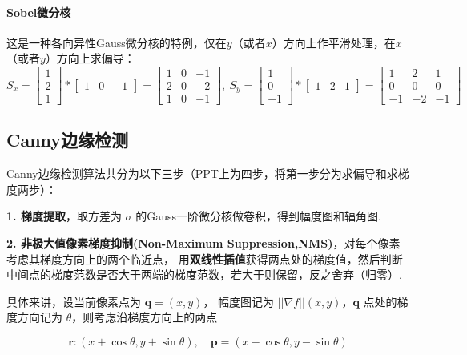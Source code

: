 \documentclass[12pt, a4paper, oneside]{ctexart}
\numberwithin{equation}{section}  %
\theoremstyle{definition}
\begin{document}
\paragraph{Sobel微分核}这是一种各向异性Gauss微分核的特例，仅在$y$（或者$x$）方向上作平滑处理，在$x$（或者$y$）方向上求偏导：
\begin{equation*}
    S_x = \left[\begin{matrix}
        1\\2\\1
    \end{matrix}\right]*\left[\begin{matrix}
        1&0&-1
    \end{matrix}\right] = \left[\begin{matrix}
        1&0&-1\\
        2&0&-2\\
        1&0&-1
    \end{matrix}\right],\ 
    S_y = \left[\begin{matrix}
        1\\0\\-1
    \end{matrix}\right]*\left[\begin{matrix}
        1&2&1
    \end{matrix}\right] = \left[\begin{matrix}
        1&2&1\\
        0&0&0\\
        -1&-2&-1
    \end{matrix}\right]
\end{equation*}
\subsection{Canny边缘检测}  %
Canny边缘检测算法共分为以下三步（PPT上为四步，将第一步分为求偏导和求梯度两步）：

\textbf{1. 梯度提取}，取方差为 \(\sigma\)
的Gauss一阶微分核做卷积，得到幅度图和辐角图.

\textbf{2. 非极大值像素梯度抑制(Non-Maximum Suppression,NMS)}，对每个像素考虑其梯度方向上的两个临近点，
用\textbf{双线性插值}获得两点处的梯度值，然后判断中间点的梯度范数是否大于两端的梯度范数，若大于则保留，反之舍弃（归零）.

具体来讲，设当前像素点为 \(\boldsymbol{q}= (x, y)\)， 幅度图记为
\(||\nabla f||(x, y)\)，\(\boldsymbol{q}\) 点处的梯度方向记为
\(\theta\)，则考虑沿梯度方向上的两点

\[\boldsymbol{r}:(x+\cos \theta, y+\sin\theta),\quad
\boldsymbol{p}=(x-\cos\theta, y-\sin\theta)\]
\end{document}
